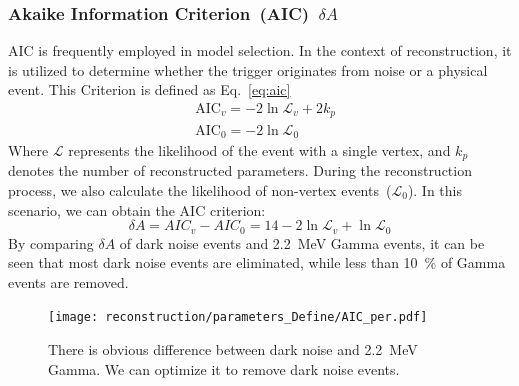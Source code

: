 \subsubsection{Akaike Information Criterion~(AIC)~$\delta A$}
AIC is frequently employed in model selection. In the context of reconstruction, it is utilized to determine whether the trigger originates from noise or a physical event. This Criterion is defined as Eq.~\eqref{eq:aic}
\begin{equation}
	\begin{aligned}
		 & \text{AIC}_v = -2 \ln \mathcal{L}_v + 2k_p \\
		 & \text{AIC}_0 = -2 \ln \mathcal{L}_0
	\end{aligned}
	\label{eq:aic}
\end{equation}
Where $\mathcal{L}$ represents the likelihood of the event with a single vertex, and $k_p$ denotes the number of reconstructed parameters. During the reconstruction process, we also calculate the likelihood of non-vertex events~($\mathcal{L}_0$). In this scenario, we can obtain the AIC criterion:
\begin{equation}
	\delta A = AIC_v - AIC_0 = 14 - 2\ln \mathcal{L}_v + \ln \mathcal{L}_0
	\label{eq:daic}
\end{equation}
By comparing $\delta A$ of dark noise events and \SI{2.2}{MeV} Gamma events, it can be seen that most dark noise events are eliminated, while less than \SI{10}{\%} of Gamma events are removed.
\begin{figure}
	\centering
	\texttt{[image: reconstruction/parameters\_Define/AIC\_per.pdf]}
	\caption{There is obvious difference between dark noise and
		\SI{2.2}{MeV} Gamma. We can optimize it to remove dark noise events.}
\end{figure}

